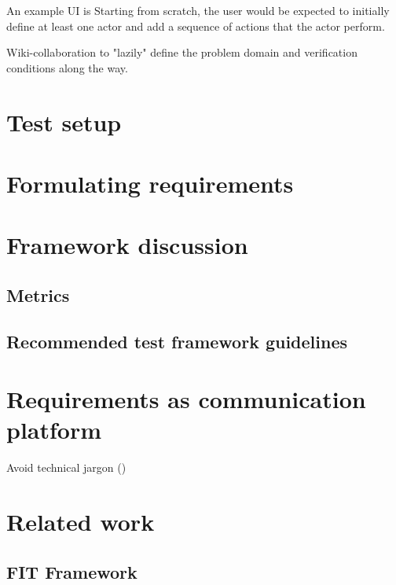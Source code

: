 \documentclass[10pt]{scrreprt}
\begin{document}

An example UI is Starting from scratch, the user would be expected to initially define at least one actor and add a sequence of actions that the actor perform.

Wiki-collaboration to "lazily" define the problem domain and verification conditions along the way.

\section{Test setup}

\section{Formulating requirements}

\section{Framework discussion}
\subsection{Metrics}
\subsection{Recommended test framework guidelines}

\section{Requirements as communication platform}

Avoid technical jargon (\cite{christel1992issues})

\section{Related work}
\subsection{FIT Framework}
\end{document}
